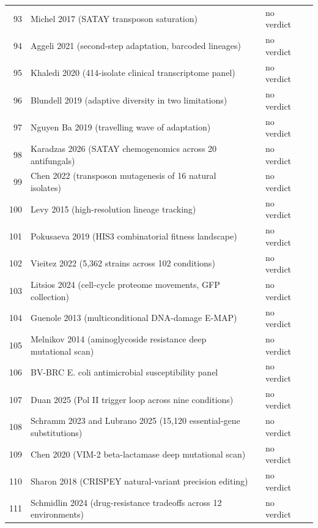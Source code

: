 \begin{longtable}{@{}r L{76mm} L{20mm} L{36mm} L{24mm}@{}}
93 & Michel 2017 (SATAY transposon saturation) &  & no verdict &  \\
94 & Aggeli 2021 (second-step adaptation, barcoded lineages) &  & no verdict &  \\
95 & Khaledi 2020 (414-isolate clinical transcriptome panel) &  & no verdict &  \\
96 & Blundell 2019 (adaptive diversity in two limitations) &  & no verdict &  \\
97 & Nguyen Ba 2019 (travelling wave of adaptation) &  & no verdict &  \\
98 & Karadzas 2026 (SATAY chemogenomics across 20 antifungals) &  & no verdict &  \\
99 & Chen 2022 (transposon mutagenesis of 16 natural isolates) &  & no verdict &  \\
100 & Levy 2015 (high-resolution lineage tracking) &  & no verdict &  \\
101 & Pokusaeva 2019 (HIS3 combinatorial fitness landscape) &  & no verdict &  \\
102 & Vieitez 2022 (5,362 strains across 102 conditions) &  & no verdict &  \\
103 & Litsios 2024 (cell-cycle proteome movements, GFP collection) &  & no verdict &  \\
104 & Guenole 2013 (multiconditional DNA-damage E-MAP) &  & no verdict &  \\
105 & Melnikov 2014 (aminoglycoside resistance deep mutational scan) &  & no verdict &  \\
106 & BV-BRC E. coli antimicrobial susceptibility panel &  & no verdict &  \\
107 & Duan 2025 (Pol II trigger loop across nine conditions) &  & no verdict &  \\
108 & Schramm 2023 and Lubrano 2025 (15,120 essential-gene substitutions) &  & no verdict &  \\
109 & Chen 2020 (VIM-2 beta-lactamase deep mutational scan) &  & no verdict &  \\
110 & Sharon 2018 (CRISPEY natural-variant precision editing) &  & no verdict &  \\
111 & Schmidlin 2024 (drug-resistance tradeoffs across 12 environments) &  & no verdict &  \\

\end{longtable}
